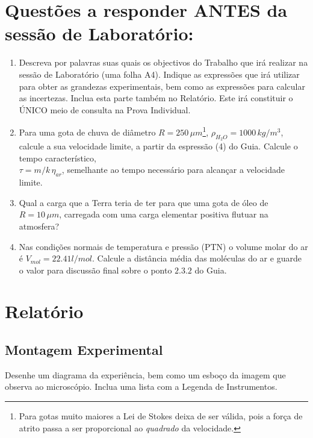 \documentclass[a4paper,12pt]{article}  %
\begin{document}
\section{\sf Questões a responder ANTES da sessão de Laboratório:}
\begin{enumerate}
\item Descreva por palavras suas quais os objectivos do Trabalho que irá realizar na sessão de Laboratório (uma folha A4). 
Indique as expressões que irá utilizar para obter as grandezas experimentais, bem como as expressões para calcular as incertezas. Inclua esta parte também no Relatório. Este irá constituir o ÚNICO meio de consulta na Prova Individual.

\item Para uma gota de chuva de diâmetro $R = 250\,\mu m$\footnote{Para gotas muito maiores a Lei de Stokes deixa de ser válida, pois a força de atrito passa a ser proporcional ao \emph{quadrado} da velocidade.}, $\rho_{H_2 O} = 1000 \, kg/m^{3}$, calcule a sua velocidade limite, a partir da espressão (4) do Guia. 
Calcule o tempo característico, \\
$\tau=m/k\,\eta_{ar}$, semelhante ao tempo necessário para alcançar a velocidade limite.
\item Qual a carga que a Terra teria de ter para que uma gota de óleo de $R = 10\,\mu m$, carregada com uma carga elementar positiva flutuar na atmosfera?
\item Nas condições  normais de temperatura e pressão (PTN) o volume molar do ar é $V_{mol}=22.41 l / mol$. Calcule a distância média das moléculas do ar e guarde o valor para discussão final sobre o ponto $2.3.2$ do Guia.
\end{enumerate}


\section{\sf Relatório}
\subsection{\sf Montagem Experimental}
Desenhe um diagrama da experiência, bem como um esboço da imagem que observa ao microscópio. Inclua uma lista com a Legenda de Instrumentos.

\begin{center}
\framebox[18cm]{\rule{0pt}{6.5cm}}
\end{center}
\end{document}
